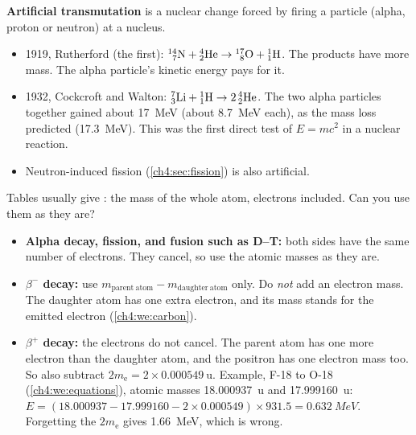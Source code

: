 \textbf{Artificial transmutation} is a nuclear change forced by firing a particle
(alpha, proton or neutron) at a nucleus.
\begin{itemize}
  \item 1919, Rutherford (the first):
        $\chFourNuc{14}{7}{N} + \chFourAlpha \to \chFourNuc{17}{8}{O} + \chFourNuc{1}{1}{H}$.
        The products have more mass. The alpha particle's kinetic energy pays for it.
  \item 1932, Cockcroft and Walton:
        $\chFourNuc{7}{3}{Li} + \chFourNuc{1}{1}{H} \to 2\,\chFourAlpha$. The two
        alpha particles together gained about \qty{17}{MeV} (about \qty{8.7}{MeV}
        each), as the mass loss predicted (\qty{17.3}{MeV}). This was the first
        direct test of $E = mc^2$ in a nuclear reaction.
  \item Neutron-induced fission (\cref{ch4:sec:fission}) is also artificial.
\end{itemize}

Tables usually give : the mass of the whole atom, electrons
included. Can you use them as they are?
\begin{itemize}
  \item \textbf{Alpha decay, fission, and fusion such as D--T:} both sides have the
        same number of electrons. They cancel, so use the atomic masses as they are.
  \item \textbf{$\beta^-$ decay:} use $m_\mathrm{parent\ atom} - m_\mathrm{daughter\ atom}$
        only. Do \emph{not} add an electron mass. The daughter atom has one extra
        electron, and its mass stands for the emitted electron
        (\cref{ch4:we:carbon}).
  \item \textbf{$\beta^+$ decay:} the electrons do not cancel. The parent atom has one
        more electron than the daughter atom, and the positron has one electron mass
        too. So also subtract $2m_\mathrm{e} = 2 \times \qty{0.000549}{\amu}$. Example,
        F-18 to O-18 (\cref{ch4:we:equations}), atomic masses \qty{18.000937}{\amu}
        and \qty{17.999160}{\amu}:
        $E = (18.000937 - 17.999160 - 2 \times 0.000549) \times 931.5 = \qty{0.632}{MeV}$.
        Forgetting the $2m_\mathrm{e}$ gives \qty{1.66}{MeV}, which is wrong.
\end{itemize}

